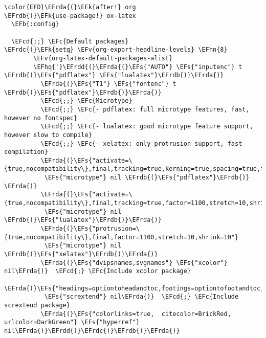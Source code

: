 \documentclass{article}
\newcommand{\EFc}[1]{\textcolor{EFc}{#1}} %
\newcommand{\EFcd}[1]{\textcolor{EFcd}{#1}} %
\newcommand{\EFs}[1]{\textcolor{EFs}{#1}} %
\newcommand{\EFk}[1]{\textcolor{EFk}{#1}} %
\newcommand{\EFb}[1]{\textcolor{EFb}{#1}} %
\newcommand{\EFv}[1]{\textcolor{EFv}{#1}} %
\newcommand{\EFhn}[1]{\textcolor{EFhn}{\textbf{#1}}} %
\newcommand{\EFhq}[1]{#1} %
\newcommand{\EFrda}[1]{\textcolor{EFrda}{#1}} %
\newcommand{\EFrdb}[1]{\textcolor{EFrdb}{#1}} %
\newcommand{\EFrdc}[1]{\textcolor{EFrdc}{#1}} %
\newcommand{\EFrdd}[1]{\textcolor{EFrdd}{#1}} %
\begin{document}
\begin{Code}
\begin{Verbatim}
\color{EFD}\EFrda{(}\EFk{after!} org
\EFrdb{(}\EFk{use-package!} ox-latex
  \EFb{:config}

  \EFcd{;;} \EFc{Default packages}
\EFrdc{(}\EFk{setq} \EFv{org-export-headline-levels} \EFhn{8}
        \EFv{org-latex-default-packages-alist}
        \EFhq{'}\EFrdd{(}\EFrda{(}\EFs{"AUTO"} \EFs{"inputenc"} t \EFrdb{(}\EFs{"pdflatex"} \EFs{"lualatex"}\EFrdb{)}\EFrda{)}
          \EFrda{(}\EFs{"T1"} \EFs{"fontenc"} t \EFrdb{(}\EFs{"pdflatex"}\EFrdb{)}\EFrda{)}
          \EFcd{;;} \EFc{Microtype}
          \EFcd{;;} \EFc{- pdflatex: full microtype features, fast, however no fontspec}
          \EFcd{;;} \EFc{- lualatex: good microtype feature support, however slow to compile}
          \EFcd{;;} \EFc{- xelatex: only protrusion support, fast compilation}
          \EFrda{(}\EFs{"activate=\{true,nocompatibility\},final,tracking=true,kerning=true,spacing=true,factor=1100,stretch=10,shrink=10"}
           \EFs{"microtype"} nil \EFrdb{(}\EFs{"pdflatex"}\EFrdb{)}         \EFrda{)}
          \EFrda{(}\EFs{"activate=\{true,nocompatibility\},final,tracking=true,factor=1100,stretch=10,shrink=10"}
           \EFs{"microtype"} nil \EFrdb{(}\EFs{"lualatex"}\EFrdb{)}\EFrda{)}
          \EFrda{(}\EFs{"protrusion=\{true,nocompatibility\},final,factor=1100,stretch=10,shrink=10"}
           \EFs{"microtype"} nil \EFrdb{(}\EFs{"xelatex"}\EFrdb{)}\EFrda{)}
          \EFrda{(}\EFs{"dvipsnames,svgnames"} \EFs{"xcolor"} nil\EFrda{)}  \EFcd{;} \EFc{Include xcolor package}
          \EFrda{(}\EFs{"headings=optiontoheadandtoc,footings=optiontofootandtoc,headlines=optiontoheadandtoc"}
           \EFs{"scrextend"} nil\EFrda{)}  \EFcd{;} \EFc{Include scrextend package}
          \EFrda{(}\EFs{"colorlinks=true,  citecolor=BrickRed, urlcolor=DarkGreen"} \EFs{"hyperref"} nil\EFrda{)}\EFrdd{)}\EFrdc{)}\EFrdb{)}\EFrda{)}
\end{Verbatim}
\end{Code}
\end{document}
